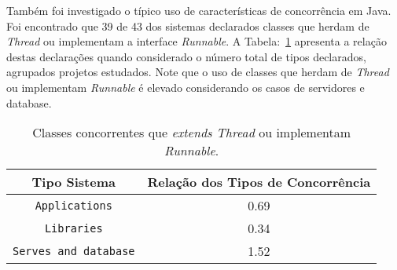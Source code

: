 Também foi investigado o típico uso de características de concorrência em Java. Foi encontrado que 39 de 43 dos sistemas declarados classes que herdam de \textit{Thread} ou implementam a interface \textit{Runnable}. A Tabela:~\ref{tab:concorrenciaJava} apresenta a relação destas declarações quando considerado o número total de tipos declarados, agrupados projetos estudados. Note que o uso de classes que herdam de \textit{Thread} ou implementam \textit{Runnable} é elevado considerando os casos de servidores e database.

\begin{table}[h]
	\centering
	\caption{Classes concorrentes que \textit{extends Thread} ou implementam \textit{Runnable}.}
	\begin{tabular}{cc}
		\hline
		Tipo Sistema & Relação dos Tipos de Concorrência\\ 
		\hline \hline
		\texttt{Applications} & 0.69 \\ 
		\texttt{Libraries} & 0.34 \\ 
		\texttt{Serves and database} & 1.52 \\ \hline
	\end{tabular}
	\label{tab:concorrenciaJava} %
\end{table}

%
%
%
%
